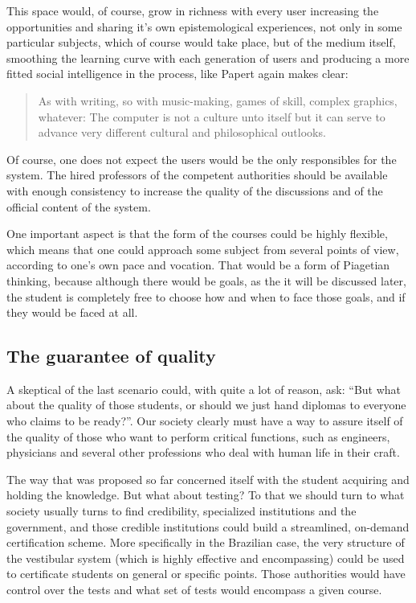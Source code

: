 This space would, of course, grow in richness with every user increasing the
opportunities and sharing it's own epistemological experiences, not only in some
particular subjects, which of course would take place, but of the medium itself,
smoothing the learning curve with each generation of users and producing a more
fitted social intelligence in the process, like Papert again makes clear:

\begin{quotation}
    As with writing, so with music-making, games of skill, complex graphics,
    whatever: The computer is not a culture unto itself but it can serve to
    advance very different cultural and philosophical outlooks.
    \cite{education:papert_mindstorms}
\end{quotation}

Of course, one does not expect the users would be the only responsibles for the
system. The hired professors of the competent authorities should be available
with enough consistency to increase the quality of the discussions and of the
official content of the system. 

One important aspect is that the form of the courses could be highly flexible,
which means that one could approach some subject from several points of view,
according to one's own pace and vocation. That would be a form of Piagetian
thinking, because although there would be goals, as the it will be discussed
later, the student is completely free to choose how and when to face those goals,
and if they would be faced at all. 

\subsection{The guarantee of quality}

A skeptical of the last scenario could, with quite a lot of reason, ask: ``But
what about the quality of those students, or should we just hand diplomas to
everyone who claims to be ready?''. Our society clearly must have a way to
assure itself of the quality of those who want to perform critical functions,
such as engineers, physicians and several other professions who deal with human
life in their craft.    

The way that was proposed so far concerned itself with the student acquiring and
holding the knowledge. But what about testing? To that we should turn to what
society usually turns to find credibility, specialized institutions and the
government, and those credible institutions could build a streamlined, on-demand 
certification scheme. More specifically in the Brazilian case, the very
structure of the vestibular system (which is highly effective and encompassing)
could be used to certificate students on general or specific points. Those
authorities would have control over the tests and what set of tests would
encompass a given course. 

